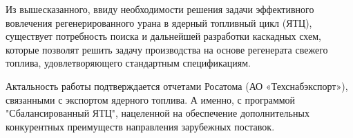 Из вышесказанного, ввиду необходимости решения задачи эффективного вовлечения регенерированного урана в ядерный топливный цикл (ЯТЦ), существует потребность поиска и дальнейшей разработки каскадных схем, которые позволят решить задачу производства на основе регенерата свежего топлива, удовлетворяющего стандартным спецификациям.


Актальность работы подтверждается отчетами Росатома (АО «Техснабэкспорт»), связанными с экспортом ядерного топлива. А  именно, с программой "Сбалансированный ЯТЦ", нацеленной на обеспечение дополнительных конкурентных преимуществ направления зарубежных поставок.


